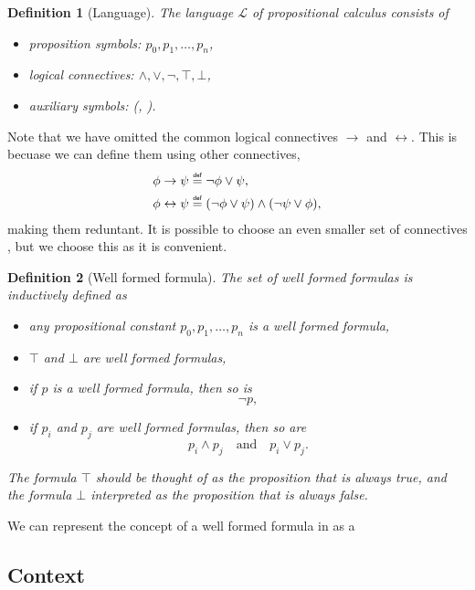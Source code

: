 \documentclass[titlepage]{article}
\newcommand\myeq{\mathrel{\overset{\makebox[0pt]{\mbox{\normalfont\tiny\sffamily def}}}{=}}}
\newtheorem{definition}{Definition}[section]
\begin{document}
\begin{definition}[Language]
    The language $\mathcal{L}$ of propositional calculus consists of
    \begin{itemize}
        \item proposition symbols: $p_0,p_1,\hdots,p_n$,
        \item logical connectives: $\wedge,\vee,\neg,\top,\bot$,
        \item auxiliary symbols: (, ).
    \end{itemize}
\end{definition}

Note that we have omitted the common logical connectives $\rightarrow$ and $\leftrightarrow$. This is becuase we can define them using other connectives, 
\begin{align*}
    \phi \rightarrow \psi &\myeq \neg \phi \vee \psi, \\
    \phi \leftrightarrow \psi &\myeq (\neg \phi \vee \psi) \wedge (\neg \psi \vee \phi),
\end{align*}making them reduntant. It is possible to choose an even smaller set of connectives \cite{vanDalen}, but we choose this as it is convenient.

\begin{definition}[Well formed formula]
    The set of well formed formulas is inductively defined as
    \begin{itemize}
        \item any propositional constant $p_0,p_1,\hdots,p_n$ is a well formed formula,
        \item $\top$ and $\bot$ are well formed formulas,
        \item if $p$ is a well formed formula, then so is
        $$\neg p,$$
        \item if $p_i$ and $p_j$ are well formed formulas, then so are
            $$p_i \wedge p_j \quad \text{and} \quad p_i \vee p_j.$$
    \end{itemize}
    The formula $\top$ should be thought of as the proposition that is always true, and the formula $\bot$ interpreted as the proposition that is always false.
\end{definition}

We can represent the concept of a well formed formula in \Agda as a \Type




\subsection{Context}
\end{document}
